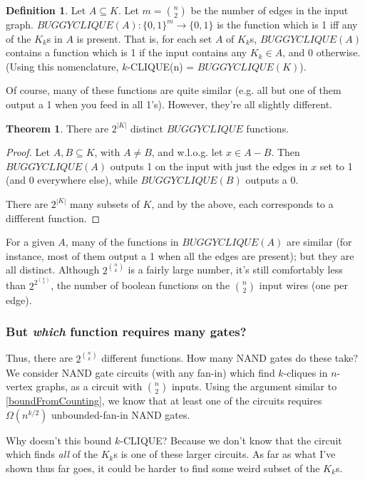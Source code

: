 \documentclass[12pt]{article}
\theoremstyle{definition}
\newtheorem{thm}{Theorem}[section]
\newtheorem{defn}{Definition}[section]
\begin{document}
\begin{defn}
\label{BUGGYCLIQUE}
Let $A \subseteq K$.
Let $m = {n \choose 2}$ be the number of edges in the input graph.
$BUGGYCLIQUE(A): \{0,1\}^m \rightarrow \{0,1\}$ is the function which
is 1 iff any of the $K_k$s in $A$ is present.
That is, for each set $A$ of $K_k$s, $BUGGYCLIQUE(A)$
contains a function which is 1 if the input contains any $K_k \in A$,
and 0 otherwise. (Using this nomenclature,
$k$-CLIQUE(n) = $BUGGYCLIQUE(K)$).
\end{defn}

Of course, many of these functions are quite similar (e.g. all but one of them
output a 1 when you feed in all 1's). However, they're all slightly different.

\begin{thm}
\label{buggyDistinct}
There are  $2^{|K|}$ distinct $BUGGYCLIQUE$ functions.
\end{thm}
\begin{proof}

Let $A,B \subseteq K$, with $A \neq B$, and w.l.o.g.
let $x \in A-B$. Then $BUGGYCLIQUE(A)$ outputs 1 on the input
with just the edges in $x$ set to 1 (and 0 everywhere else),
while $BUGGYCLIQUE(B)$ outputs a 0.

There are $2^{|K|}$ many subsets of $K$,
and by the above, each corresponds to a diffferent function.
\end{proof}

For a given $A$, many of the functions in $BUGGYCLIQUE(A)$
are similar (for instance, most
of them output a 1 when all the edges are present);
but they are all distinct.
Although $2^{n \choose k}$ is a fairly large number,
it's still comfortably less than $2^{2^{n \choose 2}}$, the number of boolean
functions on the ${n \choose 2}$ input wires (one per edge).

\subsubsection{But {\em which} function requires many gates?}

Thus, there are $2^{n \choose k}$ different functions. 
How many NAND gates do these take?
We consider NAND gate circuits (with any fan-in) which find $k$-cliques in $n$-vertex
graphs, as a circuit with $n \choose 2$ inputs. Using the argument similar to
\ref{boundFromCounting}, we know that at least one of the circuits requires
$\Omega(n^{k/2})$ unbounded-fan-in NAND gates.

Why doesn't this bound $k$-CLIQUE?
Because we don't know that the circuit which finds {\em all} of the
$K_k$s is one of these larger circuits. As far as what I've
shown thus far goes, it could be harder to find some weird subset of the $K_k$s.
\end{document}

